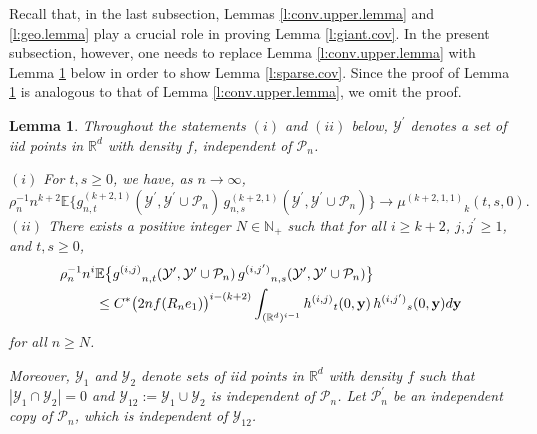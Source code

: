 \documentclass[11pt]{amsart}
\numberwithin{equation}{section}
\theoremstyle{plain}
\newtheorem{lemma}[theorem]{Lemma}
\theoremstyle{definition}
\begin{document}
Recall that, in the last subsection, Lemmas \ref{l:conv.upper.lemma} and \ref{l:geo.lemma} play a crucial role in proving Lemma \ref{l:giant.cov}. In the present subsection, however, one needs to replace Lemma \ref{l:conv.upper.lemma} with Lemma \ref{l:sparse.conv.upper.lemma} below in order to show Lemma \ref{l:sparse.cov}. Since the proof of Lemma \ref{l:sparse.conv.upper.lemma} is analogous to that of Lemma \ref{l:conv.upper.lemma}, we omit the proof.
\begin{lemma} \label{l:sparse.conv.upper.lemma}
Throughout the statements $(i)$ and $(ii)$ below, ${{\mathcal{Y}^{\prime}}}$ denotes a set of iid points in ${{\mathbb R}}^d$ with density $f$, independent of ${\mathcal P_n}$.

\noindent $(i)$ For $t,s \geq 0$, we have, as $n\to\infty$,
$$
\rho_n^{-1} n^{k+2} {\mathbb{E}} \bigl\{ g^{(k+2,1)}_{n,t}({{\mathcal{Y}^{\prime}}}, {{\mathcal{Y}^{\prime}}} \cup {\mathcal P_n})\, g^{(k+2,1)}_{n,s}({{\mathcal{Y}^{\prime}}}, {{\mathcal{Y}^{\prime}}} \cup {\mathcal P_n}) \bigr\} \to {\mu^{(k+2,1,1)}}_k(t,s,0).
$$
\noindent $(ii)$ There exists a positive integer $N \in {{\mathbb N}}_+$ such that for all $i \geq k+2$, $j, {j^{\prime}} \geq 1$, and $t,s\geq 0$,
\begin{align*}
\rho_n^{-1} n^i &{\mathbb{E}} \bigl\{ {g^{(i,j)}}_{n,t}({{\mathcal{Y}^{\prime}}}, {{\mathcal{Y}^{\prime}}} \cup {\mathcal P_n})\, {g^{(i,j^{\prime})}}_{n,s}({{\mathcal{Y}^{\prime}}}, {{\mathcal{Y}^{\prime}}} \cup {\mathcal P_n}) \bigr\} \\
&\leq C^* \bigl( 2nf(R_ne_1) \bigr)^{i-(k+2)} \int_{({{\mathbb R}}^d)^{i-1}} {h^{(i,j)}}_t(0,{{\bf y}})\, {h^{(i,{j^{\prime}})}}_s(0,{{\bf y}}) d{{\bf y}}
\end{align*}
for all $n \geq N$.
\vspace{5pt}

Moreover, ${{\mathcal{Y}}}_1$ and ${{\mathcal{Y}}}_2$ denote sets of iid points in ${{\mathbb R}}^d$ with density $f$ such that $|{{\mathcal{Y}}}_1 \cap {{\mathcal{Y}}}_2| = 0$ and ${{\mathcal{Y}}}_{12} := {{\mathcal{Y}}}_1 \cup {{\mathcal{Y}}}_2$ is independent of ${\mathcal P_n}$. Let ${\mathcal P_n^{\prime}}$ be an independent copy of ${\mathcal P_n}$, which is independent of ${{\mathcal{Y}}}_{12}$.


\end{lemma}
\end{document}
